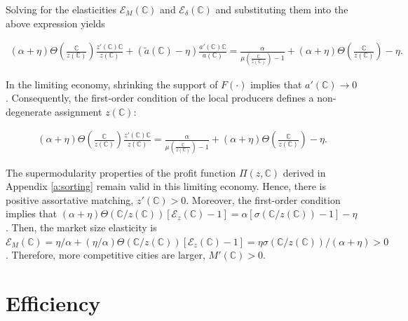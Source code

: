 Solving for the elasticities $\mathcal{E}_{M}(\mathbb{C})$ and $\mathcal{E}_{\delta}(\mathbb{C})$ and substituting them into the above expression yields

\begin{align*}
    (\alpha + \eta)\Theta\left(\frac{\mathbb{C}}{z(\mathbb{C})}\right)\frac{z'(\mathbb{C})\mathbb{C}}{z(\mathbb{C})} + (\widetilde{a}(\mathbb{C}) - \eta)\frac{a'(\mathbb{C})\mathbb{C}}{a(\mathbb{C})} = \frac{\alpha}{\mu\left(\frac{\mathbb{C}}{z(\mathbb{C})}\right) - 1} + (\alpha + \eta)\Theta\left(\frac{\mathbb{C}}{z(\mathbb{C})}\right) - \eta.
\end{align*}

In the limiting economy, shrinking the support of $F(\cdot)$ implies that $a'(\mathbb{C}) \to 0$. Consequently, the first-order condition of the local producers defines a non-degenerate assignment $z(\mathbb{C})$:

\begin{align*}
    (\alpha + \eta)\Theta\left(\frac{\mathbb{C}}{z(\mathbb{C})}\right)\frac{z'(\mathbb{C})\mathbb{C}}{z(\mathbb{C})} = \frac{\alpha}{\mu\left(\frac{\mathbb{C}}{z(\mathbb{C})}\right) - 1} + (\alpha + \eta)\Theta\left(\frac{\mathbb{C}}{z(\mathbb{C})}\right) - \eta.
\end{align*}

The supermodularity properties of the profit function $\Pi(z, \mathbb{C})$ derived in Appendix \ref{a:sorting} remain valid in this limiting economy. Hence, there is positive assortative matching, $z'(\mathbb{C}) > 0$. Moreover, the first-order condition implies that $(\alpha + \eta)\Theta\left(\mathbb{C}/z(\mathbb{C})\right)\left[\mathcal{E}_z(\mathbb{C}) - 1\right] = \alpha\left[\sigma\left(\mathbb{C}/z(\mathbb{C})\right) - 1\right] - \eta$. Then, the market size elasticity is $\mathcal{E}_M(\mathbb{C}) = \eta/\alpha + (\eta/\alpha)\Theta\left(\mathbb{C}/z(\mathbb{C})\right)\left[\mathcal{E}_z(\mathbb{C}) - 1\right] = \eta \sigma\left(\mathbb{C}/z(\mathbb{C})\right)/(\alpha + \eta) > 0$. Therefore, more competitive cities are larger, $M'(\mathbb{C}) > 0$.

\newpage
\section{Efficiency}\label{a:efficiency}

